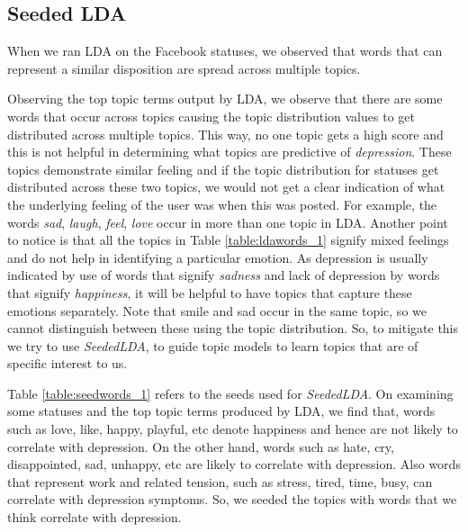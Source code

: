 \subsection{Seeded LDA}
\label{sec:seededlda}
When we ran LDA on the Facebook statuses, we observed that words that can represent a similar disposition are spread across multiple topics.

Observing the top topic terms output by LDA, we observe that there are some words that occur across topics causing the topic distribution values to get distributed across multiple topics. This way, no one topic gets a high score and this is not helpful in determining what topics are predictive of \textit{depression}. These topics demonstrate similar feeling and if the topic distribution for statuses get distributed across these two topics, we would not get a clear indication of what the underlying feeling of the user was when this was posted. For example, the words \textit{sad}, \textit{laugh}, \textit{feel}, \textit{love} occur in more than one topic in LDA. Another point to notice is that all the topics in Table \ref{table:ldawords_1} signify mixed feelings and do not help in identifying a particular emotion. As depression is usually indicated by use of words that signify \textit{sadness} and lack of depression by words that signify \textit{happiness}, it will be helpful to have topics that capture these emotions separately. Note that smile and sad occur in the same topic, so we cannot distinguish between these using the topic distribution. So, to mitigate this we try to use \textit{SeededLDA}, to guide topic models to learn topics that are of specific interest to us.

Table \ref{table:seedwords_1} refers to the seeds used for \textit{SeededLDA}. On examining some statuses and the top topic terms produced by LDA, we find that, words such as love, like, happy, playful, etc denote happiness and hence are not likely to correlate with depression. On the other hand, words such as hate, cry, disappointed, sad, unhappy, etc are likely to correlate with depression. Also words that represent work and related tension, such as stress, tired, time, busy, can correlate with depression symptoms. So, we seeded the topics with words that we think correlate with depression.

